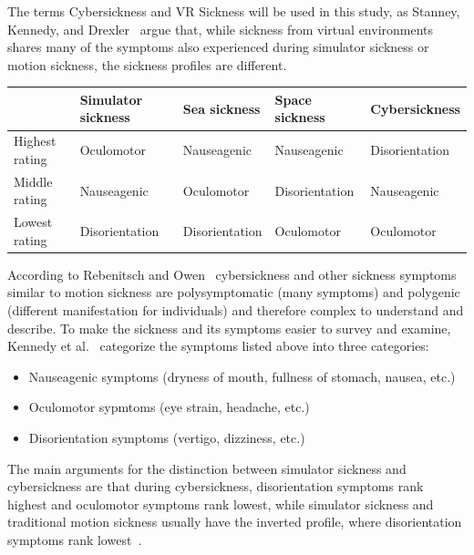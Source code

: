 The terms Cybersickness and VR Sickness will be used in this study, as Stanney, Kennedy, and
Drexler~\cite{Stanney1997} argue that, while sickness from virtual environments shares many of the symptoms also
experienced during simulator sickness or motion sickness, the sickness profiles are different.

\begin{center}
    \begin{tabular}{ l l l l l}
        \toprule
        \textbf{ } & \textbf{Simulator sickness} & \textbf{Sea sickness} & \textbf{Space sickness} &
        \textbf{Cybersickness} \\
        \midrule
        Highest rating & Oculomotor & Nauseagenic & Nauseagenic & Disorientation \\
        Middle rating & Nauseagenic & Oculomotor & Disorientation & Nauseagenic \\
        Lowest rating & Disorientation & Disorientation & Oculomotor & Oculomotor \\
        \bottomrule
    \end{tabular}
    \label{tab:symptom-profiles}
\end{center}

According to Rebenitsch and Owen~\cite{Rebenitsch2016} cybersickness and other sickness symptoms similar to motion
sickness are polysymptomatic (many symptoms) and polygenic (different manifestation for individuals) and therefore
complex to understand and describe.
To make the sickness and its symptoms easier to survey and examine, Kennedy et al.~\cite{Kennedy1993} categorize the
symptoms listed above into three categories:
\begin{itemize}
    \item Nauseagenic symptoms (dryness of mouth, fullness of stomach, nausea, etc.)
    \item Oculomotor sypmtoms (eye strain, headache, etc.)
    \item Disorientation symptoms (vertigo, dizziness, etc.)
\end{itemize}
The main arguments for the distinction between simulator sickness and cybersickness are that during cybersickness,
disorientation symptoms rank highest and oculomotor symptoms rank lowest, while simulator sickness and traditional
motion sickness usually have the inverted profile, where disorientation symptoms rank lowest~\cite{Stanney1997}.

